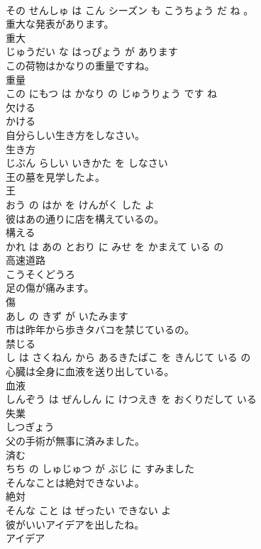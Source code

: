 \documentclass[8pt]{extreport}
\begin{document}
\begin{CJK}{UTF8}{min}
\\	その せんしゅ は こん シーズン も こうちょう だ ね 。			
\\	重大な発表があります。	
\\	重大 
\\	じゅうだい な はっぴょう が あります			
\\	この荷物はかなりの重量ですね。	
\\	重量 
\\	この にもつ は かなり の じゅうりょう です ね			
\\	欠ける	
\\	かける			
\\	自分らしい生き方をしなさい。	
\\	生き方 
\\	じぶん らしい いきかた を しなさい			
\\	王の墓を見学したよ。	
\\	王 
\\	おう の はか を けんがく した よ			
\\	彼はあの通りに店を構えているの。	
\\	構える 
\\	かれ は あの とおり に みせ を かまえて いる の			
\\	高速道路	
\\	こうそくどうろ			
\\	足の傷が痛みます。	
\\	傷 
\\	あし の きず が いたみます			
\\	市は昨年から歩きタバコを禁じているの。	
\\	禁じる 
\\	し は さくねん から あるきたばこ を きんじて いる の			
\\	心臓は全身に血液を送り出している。	
\\	血液 
\\	しんぞう は ぜんしん に けつえき を おくりだして いる			
\\	失業	
\\	しつぎょう			
\\	父の手術が無事に済みました。	
\\	済む 
\\	ちち の しゅじゅつ が ぶじ に すみました			
\\	そんなことは絶対できないよ。	
\\	絶対 
\\	そんな こと は ぜったい できない よ			
\\	彼がいいアイデアを出したね。	
\\	アイデア 

\end{CJK}
\end{document}
